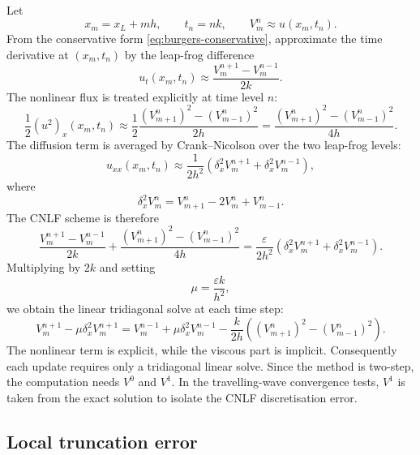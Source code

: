 \documentclass[11pt]{article}
\begin{document}
Let
\begin{equation}
    x_m=x_L+mh,
    \qquad
    t_n=nk,
    \qquad
    V_m^n\approx u(x_m,t_n).
\end{equation}
From the conservative form \eqref{eq:burgers-conservative}, approximate the time derivative at $(x_m,t_n)$ by the leap-frog difference
\begin{equation}
    u_t(x_m,t_n)
    \approx
    \frac{V_m^{n+1}-V_m^{n-1}}{2k}.
\end{equation}
The nonlinear flux is treated explicitly at time level $n$:
\begin{equation}
    \frac{1}{2}(u^2)_x(x_m,t_n)
    \approx
    \frac{1}{2}
    \frac{(V_{m+1}^n)^2-(V_{m-1}^n)^2}{2h}
    =
    \frac{(V_{m+1}^n)^2-(V_{m-1}^n)^2}{4h}.
\end{equation}
The diffusion term is averaged by Crank--Nicolson over the two leap-frog levels:
\begin{equation}
    u_{xx}(x_m,t_n)
    \approx
    \frac{1}{2h^2}
    \left(
    \delta_x^2 V_m^{n+1}
    +
    \delta_x^2 V_m^{n-1}
    \right),
\end{equation}
where
\begin{equation}
    \delta_x^2 V_m^n
    =
    V_{m+1}^n-2V_m^n+V_{m-1}^n.
\end{equation}
The CNLF scheme is therefore
\begin{equation}
    \frac{V_m^{n+1}-V_m^{n-1}}{2k}
    +
    \frac{(V_{m+1}^n)^2-(V_{m-1}^n)^2}{4h}
    =
    \frac{\varepsilon}{2h^2}
    \left(
    \delta_x^2 V_m^{n+1}
    +
    \delta_x^2 V_m^{n-1}
    \right).
    \label{eq:cnlf-raw}
\end{equation}
Multiplying by $2k$ and setting
\begin{equation}
    \mu=\frac{\varepsilon k}{h^2},
\end{equation}
we obtain the linear tridiagonal solve at each time step:
\begin{equation}
    V_m^{n+1}-\mu\delta_x^2V_m^{n+1}
    =
    V_m^{n-1}+\mu\delta_x^2V_m^{n-1}
    -
    \frac{k}{2h}
    \left((V_{m+1}^n)^2-(V_{m-1}^n)^2\right).
    \label{eq:cnlf-solve}
\end{equation}
The nonlinear term is explicit, while the viscous part is implicit.  Consequently each update requires only a tridiagonal linear solve.  Since the method is two-step, the computation needs $V^0$ and $V^1$.  In the travelling-wave convergence tests, $V^1$ is taken from the exact solution to isolate the CNLF discretisation error.

\subsection{Local truncation error}
\end{document}
